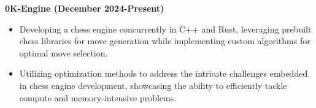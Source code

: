 \documentclass[10pt]{article}
\begin{document}
\textbf{0K-Engine (December 2024-Present)}
\begin{itemize}
    \small %
    \setlength{\itemsep}{-1pt} %
    \setlength{\parskip}{0pt} %
    \item Developing a chess engine concurrently in C++ and Rust, leveraging prebuilt chess libraries for move generation while implementing custom algorithms for optimal move selection.
    \item Utilizing optimization methods to address the intricate challenges embedded in chess engine development, showcasing the ability to efficiently tackle compute and memory-intensive problems.
\end{itemize}
\end{document}
